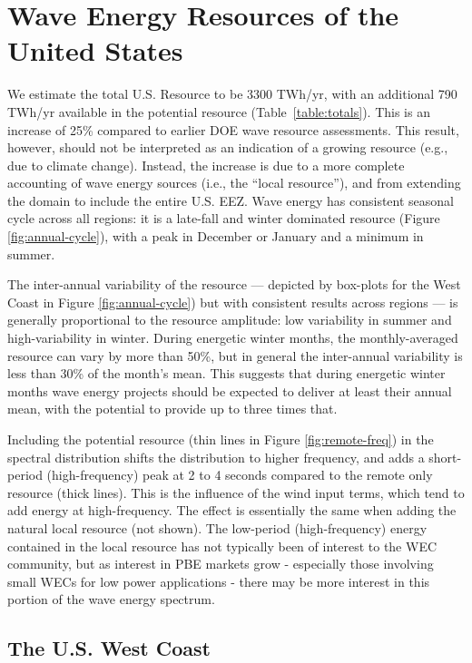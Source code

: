 \section{Wave Energy Resources of the United States}
\label{sec:results}

We estimate the total U.S. Resource to be 3300 TWh/yr, with an additional 790 TWh/yr available in the potential resource (Table~\ref{table:totals}). This is an increase of  25\% compared to earlier DOE wave resource assessments. This result, however, should not be interpreted as an indication of a growing resource (e.g., due to climate change). Instead, the increase is due to a more complete accounting of wave energy sources (i.e., the ``local resource''), and from extending the domain to include the entire U.S. EEZ. Wave energy has consistent seasonal cycle across all regions: it is a late-fall and winter dominated resource (Figure \ref{fig:annual-cycle}), with a peak in December or January and a minimum in summer.

The inter-annual variability of the resource — depicted by box-plots for the West Coast in Figure \ref{fig:annual-cycle}) but with consistent results across regions — is generally proportional to the resource amplitude: low variability in summer and high-variability in winter. During energetic winter months, the monthly-averaged resource can vary by more than 50\%, but in general the inter-annual variability is less than 30\% of the month's mean. This suggests that during energetic winter months wave energy projects should be expected to deliver at least their annual mean, with the potential to provide up to three times that.

Including the potential resource (thin lines in Figure \ref{fig:remote-freq}) in the spectral distribution shifts the distribution to higher frequency, and adds a short-period (high-frequency) peak at 2 to 4 seconds compared to the remote only resource (thick lines). This is the influence of the wind input terms, which tend to add energy at high-frequency. The effect is essentially the same when adding the natural local resource (not shown). The low-period (high-frequency) energy contained in the local resource has not typically been of interest to the WEC community, but as interest in PBE markets grow - especially those involving small WECs for low power applications - there may be more interest in this portion of the wave energy spectrum.

\subsection{The U.S. West Coast}

